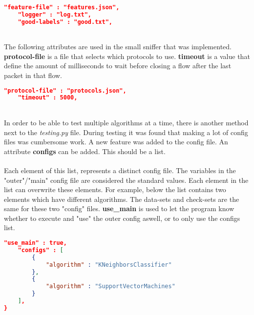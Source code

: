 \begin{lstlisting}[language=json,firstnumber=1]
    "feature-file" : "features.json",
    "logger" : "log.txt",
    "good-labels" : "good.txt",
\end{lstlisting}~\\
\noindent The following attributes are used in the small sniffer that was implemented. \textbf{protocol-file} is a file that selects which protocols to use.  \textbf{timeout} is a value that define the amount of milliseconds to wait before closing a flow after the last packet in that flow.

\begin{lstlisting}[language=json,firstnumber=1]
    "protocol-file" : "protocols.json",
    "timeout" : 5000,
\end{lstlisting}~\\
\noindent In order to be able to test multiple algorithms at a time, there is another method next to the \textit{testing.py} file. During testing it was found that making a lot of config files was cumbersome work. A new feature was added to the config file. An attribute \textbf{configs} can be added. This should be a list. \\
\\
Each element of this list, represents a distinct config file. The variables in the "outer"/"main" config file are considered the standard values. Each element in the list can overwrite these elements. For example, below the list contains two elements which have different algorithms. The data-sets and check-sets are the same for these two "config" files. \textbf{use\_main} is used to let the program know whether to execute and "use" the outer config aswell, or to only use the configs list.
\begin{lstlisting}[language=json,firstnumber=1]
    "use_main" : true,
    "configs" : [
        {
            "algorithm" : "KNeighborsClassifier"
        },
        {
            "algorithm" : "SupportVectorMachines"
        }
    ],
}
\end{lstlisting}
